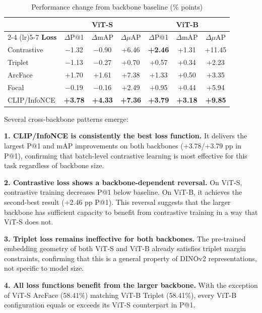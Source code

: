 \documentclass[
    english,
]{VUMIFPSbakalaurinis}
\begin{document}
\begin{table}[H]
\centering
\caption{Performance change from backbone baseline (\% points)}
\label{tab:results_delta}
\begin{tabular}{lcccccc}
\toprule
 & \multicolumn{3}{c}{\textbf{ViT-S}} & \multicolumn{3}{c}{\textbf{ViT-B}} \\
\cmidrule(lr){2-4} \cmidrule(lr){5-7}
\textbf{Loss} & $\Delta$P@1 & $\Delta$mAP & $\Delta\mu$AP & $\Delta$P@1 & $\Delta$mAP & $\Delta\mu$AP \\
\midrule
Contrastive  & $-$1.32 & $-$0.90 & +6.46 & \textbf{+2.46} & +1.31 & +11.45 \\
Triplet      & $-$1.13 & $-$0.27 & +0.70 & +0.57 & +0.34 & +2.23 \\
ArcFace      & +1.70 & +1.61 & +7.38 & +1.33 & +0.50 & +3.35 \\
Focal        & $-$0.19 & $-$0.16 & +2.49 & +0.95 & +0.44 & +5.94 \\
CLIP/InfoNCE & \textbf{+3.78} & \textbf{+4.33} & \textbf{+7.36} & \textbf{+3.79} & \textbf{+3.18} & \textbf{+9.85} \\
\bottomrule
\end{tabular}
\end{table}

Several cross-backbone patterns emerge:

\textbf{1. CLIP/InfoNCE is consistently the best loss function.} It delivers the largest P@1 and mAP improvements on both backbones (+3.78/+3.79 pp in P@1), confirming that batch-level contrastive learning is most effective for this task regardless of backbone size.

\textbf{2. Contrastive loss shows a backbone-dependent reversal.} On ViT-S, contrastive training decreases P@1 below baseline. On ViT-B, it achieves the second-best result (+2.46 pp P@1). This reversal suggests that the larger backbone has sufficient capacity to benefit from contrastive training in a way that ViT-S does not.

\textbf{3. Triplet loss remains ineffective for both backbones.} The pre-trained embedding geometry of both ViT-S and ViT-B already satisfies triplet margin constraints, confirming that this is a general property of DINOv2 representations, not specific to model size.

\textbf{4. All loss functions benefit from the larger backbone.} With the exception of ViT-S ArcFace (58.41\%) matching ViT-B Triplet (58.41\%), every ViT-B configuration equals or exceeds its ViT-S counterpart in P@1.
\end{document}
